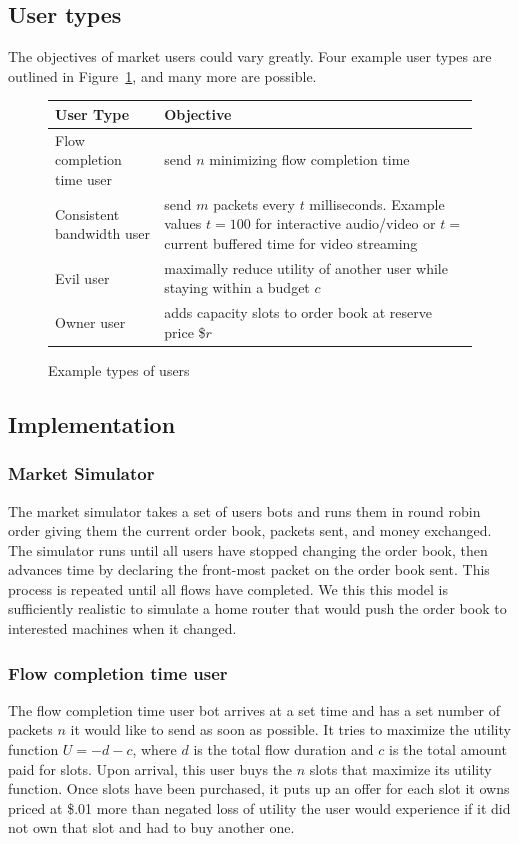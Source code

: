 \subsection{User types}
The objectives of market users could vary greatly. Four example user types are outlined in Figure~\ref{f:user_types}, and many more are possible.
\begin{figure}
\begin{tabular}{|p{}|p{}|}
\hline
User Type & Objective \\
\hline
Flow completion time user & send $n$ minimizing flow completion time \\
\hline
Consistent bandwidth user & send $m$ packets every $t$ milliseconds. Example values $t=100$ for interactive audio/video or $t=$ current buffered time for video streaming \\
\hline
Evil user & maximally reduce utility of another user while staying within a budget $c$ \\
\hline
Owner user & adds capacity slots to order book at reserve price \$$r$\\
\hline
\end{tabular}
\caption{Example types of users}
\label{f:user_types}
\end{figure}

\subsection{Implementation}
\subsubsection{Market Simulator}
The market simulator takes a set of users bots and runs them in round robin order giving them the current order book, packets sent, and money exchanged. The simulator runs until all users have stopped changing the order book, then advances time by declaring the front-most packet on the order book sent. This process is repeated until all flows have completed. We this this model is sufficiently realistic to simulate a home router that would push the order book to interested machines when it changed.

\subsubsection{Flow completion time user}
The flow completion time user bot arrives at a set time and has a set number of packets $n$ it would like to send as soon as possible. It tries to maximize the utility function $U= -d - c$, where $d$ is the total flow duration and $c$ is the total amount paid for slots.
Upon arrival, this user buys the $n$ slots that maximize its utility function. Once slots have been purchased, it puts up an offer for each slot it owns priced at \$.01 more than negated loss of utility the user would experience if it did not own that slot and had to buy another one.


